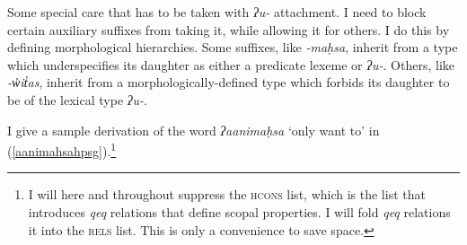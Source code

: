 Some special care that has to be taken with \textit{ʔu-} attachment. I need to block certain auxiliary suffixes from taking it, while allowing it for others. I do this by defining morphological hierarchies. Some suffixes, like \textit{-maḥsa}, inherit from a type which underspecifies its daughter as either a predicate lexeme or \textit{ʔu-}. Others, like \textit{-w̓it̓as}, inherit from a morphologically-defined type which forbids its daughter to be of the lexical type \textit{ʔu-}.

I give a sample derivation of the word \textit{ʔaanimaḥsa} `only want to' in (\ref{aanimahsahpsg}).\footnote{I will here and throughout suppress the \textsc{hcons} list, which is the list that introduces \textit{qeq} relations that define scopal properties. I will fold \textit{qeq} relations it into the \textsc{rels} list. This is only a convenience to save space.}

